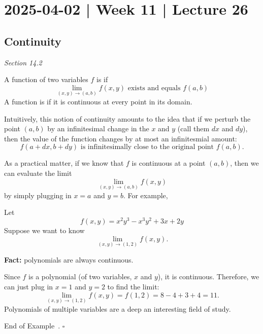 \documentclass[10pt]{article}
\theoremstyle{definition}
\newtheorem{example}[theorem]{Example}
\renewenvironment{example}
{\begin{oldexample}}
  {\par\smallskip\hfill   End of Example~\theexample. $\square$    \par\end{oldexample}}
\newcommand{\1}[1]{\textbf{1}_{\left[#1\right]}} %
\newcommand{\dempfcolor}[1]{{\color{RoyalBlue}#1}}
\newcommand{\demph}[1]{\dempfcolor{{\sl #1}}}
\begin{document}
\newpage
\section{2025-04-02 | Week 11 | Lecture 26}
\subsection{Continuity}
 \textit{Section 14.2}


A function of two variables $f$ is \demph{continuous at $(a,b)$} if
\begin{equation*}
  \lim_{(x,y) \to (a,b)}f(x,y)\text{ exists and equals }f(a,b)
\end{equation*}
A function is \demph{continuous} if it is continuous at every point in its
domain.

Intuitively, this notion of continuity amounts to the idea that if we perturb
the point $(a,b)$ by an infinitesimal change in the $x$ and $y$ (call them
$dx$ and $dy$), then the value of the function changes by at most an
infinitesmial amount:
\begin{equation*}
  f(a+dx, b+dy) \text{ is infinitesimally close to the original point } f(a,b).
\end{equation*}

As a practical matter, if we know that $f$ is continuous at a point $(a,b)$,
then we can evaluate the limit
\begin{equation*}
  \lim_{(x,y)\to (a,b)}f(x,y)
\end{equation*}
by simply plugging in $x=a$ and $y=b$. For example,

\begin{example}[Polynomial functions]
  Let
  \begin{equation*}
    f(x,y)=x^{2}y^{3}-x^{3}y^{2}+3x+2y
  \end{equation*}
  Suppose we want to know
  \begin{equation*}
    \lim_{(x,y)\to (1,2)} f(x,y).
  \end{equation*}

  \textbf{Fact:} polynomials are always continuous.

  Since $f$ is a polynomial (of two variables, $x$ and $y$), it is continuous.
  Therefore, we can just plug in $x=1$ and $y=2$ to find the limit:
  \begin{equation*}
    \lim_{(x,y)\to (1,2)} f(x,y) =  f(1,2) = 8-4+3+4=11.  
  \end{equation*}
  Polynomials of multiple variables are a deep an interesting field of study.
\end{example}
\end{document}
